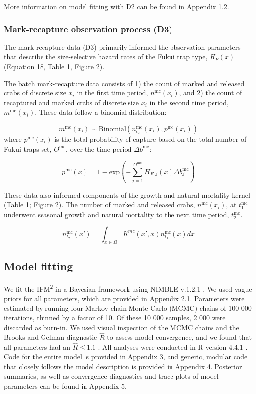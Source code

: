 \documentclass{article}
\begin{document}
More information on model fitting with D2 can be found in Appendix 1.2.

\subsubsection*{Mark-recapture observation process (D3)}

The mark-recapture data (D3) primarily informed the observation parameters that describe the size-selective hazard rates of the Fukui trap type, $H_F(x)$ (Equation 18, Table 1, Figure 2).

The batch mark-recapture data consists of 1) the count of marked and released crabs of discrete size $x_i$ in the first time period, $n^{\text{mc}}(x_i)$, and 2) the count of recaptured and marked crabs of discrete size $x_i$ in the second time period, $m^{\text{mc}}(x_i)$. These data follow a binomial distribution:

\begin{equation}
m^{\text{mc}}(x_i) \sim \text{Binomial}(n^{\text{mc}}_{t_2}(x_i), p^{\text{mc}}(x_i)) 
\end{equation}
where $p^{\text{mc}}(x_i)$ is the total probability of capture based on the total number of Fukui traps set, $O^{\text{mc}}$, over the time period $\Delta b^{\text{mc}}$:

\begin{equation}
p^{\text{mc}}(x) = 1-\text{exp}\left(-\sum_{j=1}^{O^{\text{mc}}} H_{F,j}(x)\Delta b^{\text{mc}}_j\right)
\end{equation}

These data also informed components of the growth and natural mortality kernel (Table 1; Figure 2). The number of marked and released crabs, $n^{\text{mc}}(x_i)$, at $t_1^{\text{mc}}$ underwent seasonal growth and natural mortality to the next time period, $t_2^{\text{mc}}$.

\begin{equation}
n^{\text{mc}}_{t_2}(x') = \int_{x \in \Omega} K^{mc}(x',x) n^{\text{mc}}_{t_1}(x)dx
\end{equation}

\subsection{Model fitting}
We fit the IPM\textsuperscript{2} in a Bayesian framework using NIMBLE v.1.2.1 \parencite{de2017programming}. We used vague priors for all parameters, which are provided in Appendix 2.1. Parameters were estimated by running four Markov chain Monte Carlo (MCMC) chains of 100 000 iterations, thinned by a factor of 10. Of these 10 000 samples, 2 000 were discarded as burn-in. We used visual inspection of the MCMC chains and the Brooks and Gelman diagnostic $\hat{R}$ to assess model convergence, and we found that all parameters had an $\hat{R} \leq 1.1$ \parencite{brooks1998general}. All analyses were conducted in R version 4.4.1 \parencite{Rcore}. Code for the entire model is provided in Appendix 3, and generic, modular code that closely follows the model description is provided in Appendix 4. Posterior summaries, as well as convergence diagnostics and trace plots of model parameters can be found in Appendix 5.
\end{document}
